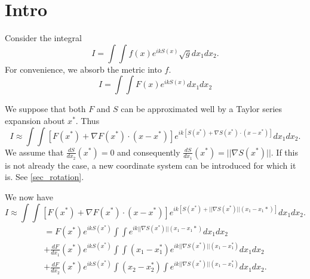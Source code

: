\documentclass{article}
\newcommand{\norm}[1]{||#1||}
\theoremstyle{plain}
\begin{document}


\section{Intro}\label{sec_intro}

Consider the integral
\begin{equation}
	I = \int\int f(x) e^{ikS(x)} \sqrt{g} dx_1dx_2.
\end{equation}
For convenience, we absorb the metric into $f$.
\begin{equation}
	I = \int\int F(x) e^{ikS(x)} dx_1dx_2
\end{equation}



We suppose that both $F$ and $S$ can be approximated well by a Taylor series expansion about $x^*$.
Thus
\begin{equation}
	I \approx \int\int \left[ F(x^*) + \nabla F(x^*) \cdot (x-x^*) \right] e^{ik\left[S(x^*) + \nabla S(x^*)\cdot (x-x^*) \right]} dx_1dx_2.
\end{equation}
We assume that $\frac{dS}{dx_2}(x^*) = 0$ and consequently $\frac{dS}{dx_1}(x^*) = \norm{\nabla S(x^*)}$.
If this is not already the case, a new coordinate system can be introduced for which it is. See \ref{sec_rotation}.


We now have
\begin{equation}
	I \approx \int\int \left[ F(x^*) + \nabla F(x^*) \cdot (x-x^*) \right] e^{ik\left[S(x^*) + \norm{\nabla S(x^*)}(x_1-x_1*) \right]} dx_1dx_2.
\end{equation}
\begin{multline}
	= F(x^*) e^{ikS(x^*)} \int\int e^{ik\norm{\nabla S(x^*)}(x_1-x_1*)} dx_1dx_2 \\
	+ \frac{dF}{dx_1}(x^*) e^{ikS(x^*)} \int\int (x_1-x_1^*) e^{ik\norm{\nabla S(x^*)}(x_1-x_1^*)} dx_1dx_2 \\
	+ \frac{dF}{dx_2}(x^*) e^{ikS(x^*)} \int (x_2-x_2^*) \int e^{ik\norm{\nabla S(x^*)}(x_1-x_1^*)} dx_1dx_2.
\end{multline}
\end{document}
